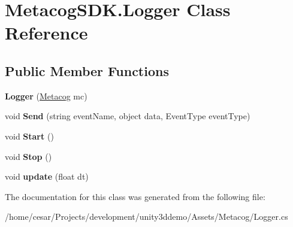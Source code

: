 \hypertarget{classMetacogSDK_1_1Logger}{}\section{Metacog\+S\+D\+K.\+Logger Class Reference}
\label{classMetacogSDK_1_1Logger}
\subsection*{Public Member Functions}
\begin{DoxyCompactItemize}
\item 
{\bfseries Logger} (\hyperlink{classMetacogSDK_1_1Metacog}{Metacog} mc)\hypertarget{classMetacogSDK_1_1Logger_a3e137315344b8a7469d863bfd3495c2c}{}\label{classMetacogSDK_1_1Logger_a3e137315344b8a7469d863bfd3495c2c}

\item 
void {\bfseries Send} (string event\+Name, object data, Event\+Type event\+Type)\hypertarget{classMetacogSDK_1_1Logger_aa3b730166a419e25aa9a5c22a0d68690}{}\label{classMetacogSDK_1_1Logger_aa3b730166a419e25aa9a5c22a0d68690}

\item 
void {\bfseries Start} ()\hypertarget{classMetacogSDK_1_1Logger_a5394b2435a693ba6b7b7745bb6d93129}{}\label{classMetacogSDK_1_1Logger_a5394b2435a693ba6b7b7745bb6d93129}

\item 
void {\bfseries Stop} ()\hypertarget{classMetacogSDK_1_1Logger_a4539588c58009fd4343a83757cf5b84f}{}\label{classMetacogSDK_1_1Logger_a4539588c58009fd4343a83757cf5b84f}

\item 
void {\bfseries update} (float dt)\hypertarget{classMetacogSDK_1_1Logger_a42cbf5df7e9d83ee96010c63eb62d66a}{}\label{classMetacogSDK_1_1Logger_a42cbf5df7e9d83ee96010c63eb62d66a}

\end{DoxyCompactItemize}


The documentation for this class was generated from the following file\+:\begin{DoxyCompactItemize}
\item 
/home/cesar/\+Projects/development/unity3ddemo/\+Assets/\+Metacog/Logger.\+cs\end{DoxyCompactItemize}
